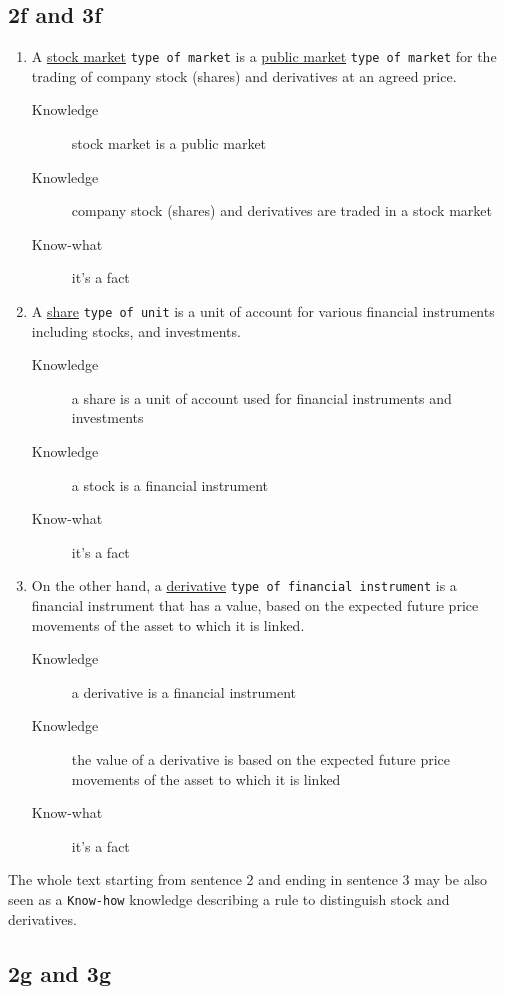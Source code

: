 \documentclass[a4paper,10pt,twoside,twocolumn]{article}
\begin{document}
\subsection{2f and 3f}
\label{sec:org836c9b4}
\begin{enumerate}
\item A \uline{stock market} \texttt{type of market} is a \uline{public market} \texttt{type of market} for the trading of company stock (shares) and derivatives at an agreed price.
\begin{description}
\item[{Knowledge}] stock market is a public market
\item[{Knowledge}] company stock (shares) and derivatives are traded in a stock market
\item[{Know-what}] it's a fact
\end{description}
\item A \uline{share} \texttt{type of unit} is a unit of account for various financial instruments including stocks, and investments.
\begin{description}
\item[{Knowledge}] a share is a unit of account used for financial instruments and investments
\item[{Knowledge}] a stock is a financial instrument
\item[{Know-what}] it's a fact
\end{description}
\item On the other hand, a \uline{derivative} \texttt{type of financial instrument} is a financial instrument that has a value, based on the expected future price movements of the asset to which it is linked.
\begin{description}
\item[{Knowledge}] a derivative is a financial instrument
\item[{Knowledge}] the value of a derivative is based on the expected future price movements of the asset to which it is linked
\item[{Know-what}] it's a fact
\end{description}
\end{enumerate}

The whole text starting from sentence 2 and ending in sentence 3 may be also seen as a \texttt{Know-how} knowledge describing a rule to distinguish stock and derivatives.

\subsection{2g and 3g}
\label{sec:org35537ed}
\end{document}
